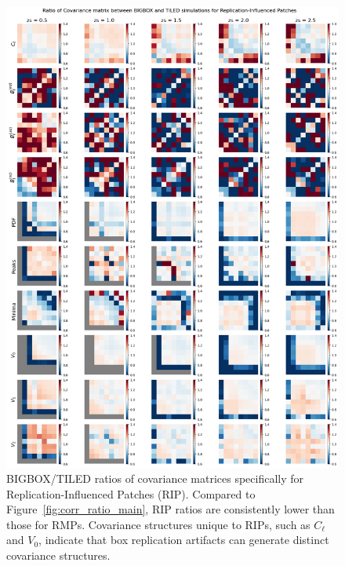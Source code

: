 \begin{figure}[p]
    \centering
    \includegraphics[width=\textwidth]{figures/results/cov_ratio_RIP.png}
    \caption[Covariance Ratios for RIP]{BIGBOX/TILED ratios of covariance matrices specifically for Replication-Influenced Patches (RIP). Compared to Figure~\ref{fig:corr_ratio_main}, RIP ratios are consistently lower than those for RMPs. Covariance structures unique to RIPs, such as $C_\ell$ and $V_0$, indicate that box replication artifacts can generate distinct covariance structures.}
    \label{fig:boxreplication_cov_RIP}
\end{figure}

